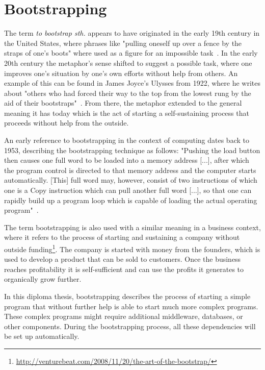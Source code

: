 \section{Bootstrapping}
\label{fundamentals:bootstrapping}

The term \textit{to bootstrap sth.} appears to have originated in the early 19th century in the United States, where phrases like "pulling oneself up over a fence by the straps of one's boots" where used as a figure for an impossible task~\autocite{bootstrap:history}.
In the early 20th century the metaphor's sense shifted to suggest a possible task, where one improves one's situation by one's own efforts without help from others.
An example of this can be found in James Joyce's Ulysses from 1922, where he writes about "others who had forced their way to the top from the lowest rung by the aid of their bootstraps"~\autocite{bootstrap:ulysses}.
From there, the metaphor extended to the general meaning it has today which is the act of starting a self-sustaining process that proceeds without help from the outside.

An early reference to bootstrapping in the context of computing dates back to 1953, describing the bootstrapping technique as follows: "Pushing the load button then causes one full word to be loaded into a memory address [...], after which the program control is directed to that memory address and the computer starts automatically. [This] full word may, however, consist of two instructions of which one is a Copy instruction which can pull another full word [...], so that one can rapidly build up a program loop which is capable of loading the actual operating program"~\autocite{bootstrap:early}.

The term bootstrapping is also used with a similar meaning in a business context, where it refers to the process of starting and sustaining a company without outside funding\footnote{\url{http://venturebeat.com/2008/11/20/the-art-of-the-bootstrap/}}.
The company is started with money from the founders, which is used to develop a product that can be sold to customers.
Once the business reaches profitability it is self-sufficient and can use the profits it generates to organically grow further.

In this diploma thesis, bootstrapping describes the process of starting a simple program that without further help is able to start much more complex programs.
These complex programs might require additional middleware, databases, or other components.
During the bootstrapping process, all these dependencies will be set up automatically.
